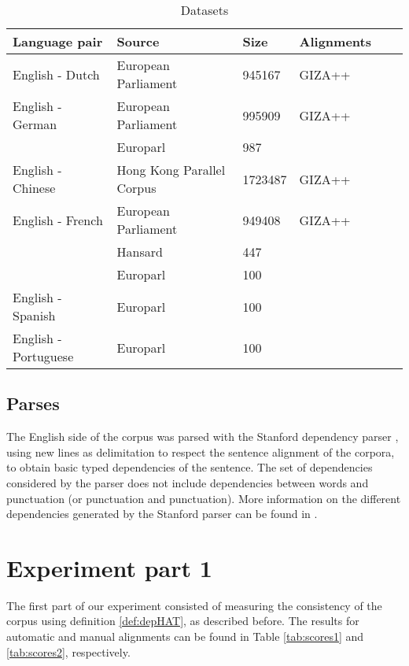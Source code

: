 \documentclass[hidelinks]{report}
\begin{document}
\begin{table}
\begin{tabular}{|l|l|l|l|l|l|}
\hline
\bf Language pair & \bf Source & \bf Size & \bf Alignments\\
\hline \hline
English - Dutch & European Parliament & 945167 & {\small GIZA++} \\
\hline
English - German & European Parliament & 995909 & {\small GIZA++} \\
& Europarl & 987 & {\small\cite{pado2006optimal}}\\
\hline
English - Chinese & Hong Kong Parallel Corpus & 1723487 & {\small GIZA++} \\
\hline
English - French & European Parliament & 949408 & {\small GIZA++} \\
& Hansard & 447 & {\small \cite{och2000improved}}\\
& Europarl & 100 & {\small \cite{graca2008building}} \\
\hline
English - Spanish & Europarl & 100 & {\small \cite{graca2008building}} \\
\hline
English - Portuguese & Europarl & 100 & {\small \cite{graca2008building}}\\
\hline
\end{tabular}
\caption{Datasets}\label{tab:datasets}
\end{table}

\subsection{Parses}

The English side of the corpus was parsed with the Stanford dependency parser \citep{de2008stanford}, using new lines as delimitation to respect the sentence alignment of the corpora, to obtain basic typed dependencies of the sentence.  The set of dependencies considered by the parser does not include dependencies between words and punctuation (or punctuation and punctuation). More information on the different dependencies generated by the Stanford parser can be found in \cite{de2006generating}.

\section{Experiment part 1}

The first part of our experiment consisted of measuring the consistency of the corpus using definition \ref{def:depHAT}, as described before. The results for automatic and manual alignments can be found in Table \ref{tab:scores1} and \ref{tab:scores2}, respectively.
\end{document}
